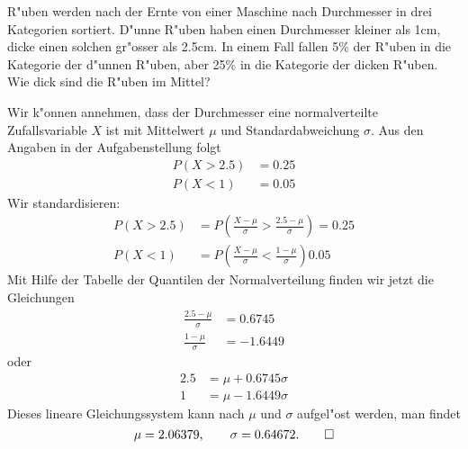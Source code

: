 R"uben werden nach der Ernte von einer Maschine nach Durchmesser
in drei Kategorien sortiert. D"unne R"uben haben einen Durchmesser
kleiner als 1cm, dicke einen solchen gr"osser als 2.5cm. In einem
Fall fallen 5\% der R"uben in die Kategorie der d"unnen R"uben,
aber 25\% in die Kategorie der dicken R"uben. Wie dick sind
die R"uben im Mittel?

\begin{loesung}
Wir k"onnen annehmen, dass der Durchmesser eine normalverteilte
Zufallsvariable $X$ ist
mit Mittelwert $\mu$ und Standardabweichung $\sigma$. Aus den
Angaben in der Aufgabenstellung folgt
\begin{align*}
P(X>2.5)&= 0.25\\
P(X<1)&= 0.05
\end{align*}
Wir standardisieren:
\begin{align*}
P(X>2.5)&=P\left(
\frac{X-\mu}{\sigma}>\frac{2.5-\mu}{\sigma}
\right)=0.25
\\
P(X<1)&=P\left(
\frac{X-\mu}{\sigma}<\frac{1-\mu}{\sigma}
\right)0.05
\end{align*}
Mit Hilfe der Tabelle der Quantilen der Normalverteilung finden
wir jetzt die Gleichungen
\begin{align*}
\frac{2.5-\mu}{\sigma}&=0.6745
\\
\frac{1-\mu}{\sigma}&=-1.6449
\end{align*}
oder
\begin{align*}
2.5&=\mu+0.6745\sigma\\
1&=\mu-1.6449\sigma
\end{align*}
Dieses lineare Gleichungssystem kann nach $\mu$ und $\sigma$ aufgel"ost
werden, man findet
\[
\mu=2.06379,\qquad
\sigma=0.64672.
\qedhere
\]
\end{loesung}

